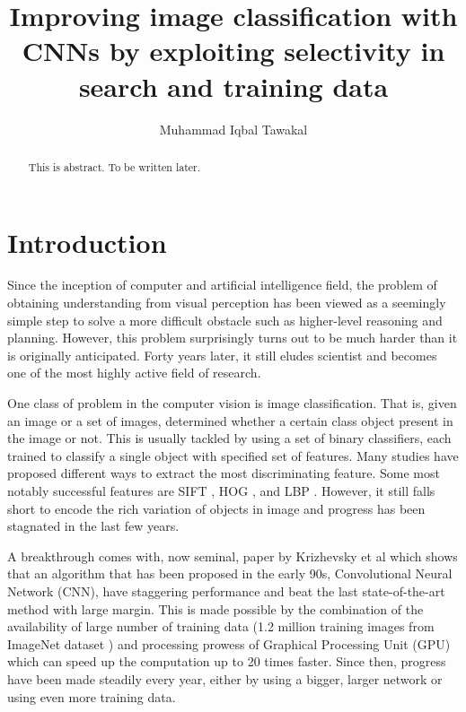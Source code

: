 \documentclass[a4paper]{article}
\begin{document}
\title{Improving image classification with CNNs by exploiting selectivity in search and training data}

\author{Muhammad Iqbal Tawakal}

\maketitle

\begin{abstract}
This is abstract. To be written later.
\end{abstract}

\section{Introduction}
Since the inception of computer and artificial intelligence field, the problem of obtaining understanding from visual perception has been viewed as a seemingly simple step to solve a more difficult obstacle such as higher-level reasoning and planning. However, this problem surprisingly turns out to be much harder than it is originally anticipated. Forty years later, it still eludes scientist and becomes one of the most highly active field of research.

One class of problem in the computer vision is image classification. That is, given an image or a set of images, determined whether a certain class object present in the image or not. This is usually tackled by using a set of binary classifiers, each trained to classify a single object with specified set of features. Many studies have proposed different ways to extract the most discriminating feature. Some most notably successful features are SIFT \cite{lowe2004sift}, HOG \cite{dalal2005hog}, and LBP \cite{ahonen2006lbp}. However, it still falls short to encode the rich variation of objects in image and progress has been stagnated in the last few years.

A breakthrough comes with, now seminal, paper by Krizhevsky et al \cite{krizhevsky2012} which shows that an algorithm that has been proposed in the early 90s, Convolutional Neural Network (CNN), have staggering performance and beat the last state-of-the-art method with large margin. This is made possible by the combination of the availability of large number of training data (1.2 million training images from ImageNet dataset \cite{deng2009imagenet}) and processing prowess of Graphical Processing Unit (GPU) which can speed up the computation up to 20 times faster. Since then, progress have been made steadily every year, either by using a bigger, larger network or using even more training data.
\end{document}
